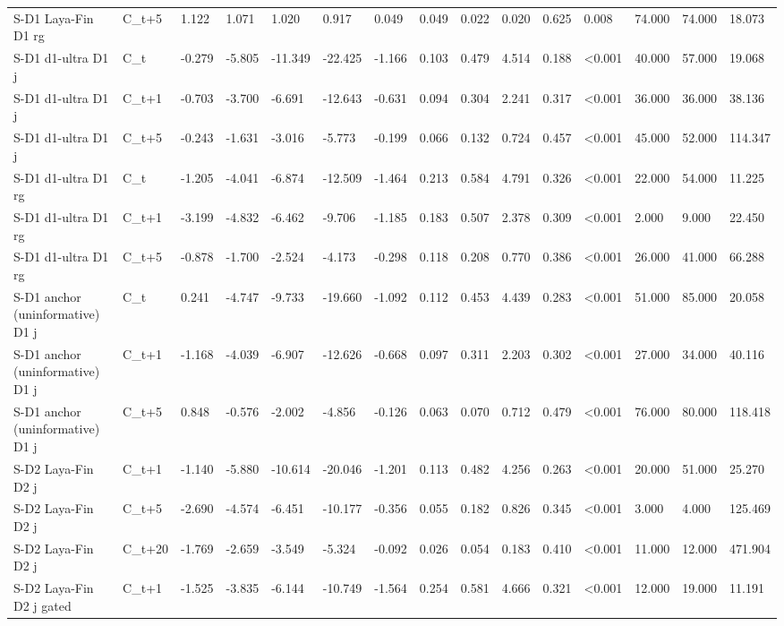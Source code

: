 \begin{tabular}{lllllllllllllll}
S-D1 Laya-Fin D1 rg & C\_t+5 & 1.122 & 1.071 & 1.020 & 0.917 & 0.049 & 0.049 & 0.022 & 0.020 & 0.625 & 0.008 & 74.000 & 74.000 & 18.073 \\
S-D1 d1-ultra D1 j & C\_t & -0.279 & -5.805 & -11.349 & -22.425 & -1.166 & 0.103 & 0.479 & 4.514 & 0.188 & <0.001 & 40.000 & 57.000 & 19.068 \\
S-D1 d1-ultra D1 j & C\_t+1 & -0.703 & -3.700 & -6.691 & -12.643 & -0.631 & 0.094 & 0.304 & 2.241 & 0.317 & <0.001 & 36.000 & 36.000 & 38.136 \\
S-D1 d1-ultra D1 j & C\_t+5 & -0.243 & -1.631 & -3.016 & -5.773 & -0.199 & 0.066 & 0.132 & 0.724 & 0.457 & <0.001 & 45.000 & 52.000 & 114.347 \\
S-D1 d1-ultra D1 rg & C\_t & -1.205 & -4.041 & -6.874 & -12.509 & -1.464 & 0.213 & 0.584 & 4.791 & 0.326 & <0.001 & 22.000 & 54.000 & 11.225 \\
S-D1 d1-ultra D1 rg & C\_t+1 & -3.199 & -4.832 & -6.462 & -9.706 & -1.185 & 0.183 & 0.507 & 2.378 & 0.309 & <0.001 & 2.000 & 9.000 & 22.450 \\
S-D1 d1-ultra D1 rg & C\_t+5 & -0.878 & -1.700 & -2.524 & -4.173 & -0.298 & 0.118 & 0.208 & 0.770 & 0.386 & <0.001 & 26.000 & 41.000 & 66.288 \\
S-D1 anchor (uninformative) D1 j & C\_t & 0.241 & -4.747 & -9.733 & -19.660 & -1.092 & 0.112 & 0.453 & 4.439 & 0.283 & <0.001 & 51.000 & 85.000 & 20.058 \\
S-D1 anchor (uninformative) D1 j & C\_t+1 & -1.168 & -4.039 & -6.907 & -12.626 & -0.668 & 0.097 & 0.311 & 2.203 & 0.302 & <0.001 & 27.000 & 34.000 & 40.116 \\
S-D1 anchor (uninformative) D1 j & C\_t+5 & 0.848 & -0.576 & -2.002 & -4.856 & -0.126 & 0.063 & 0.070 & 0.712 & 0.479 & <0.001 & 76.000 & 80.000 & 118.418 \\
S-D2 Laya-Fin D2 j & C\_t+1 & -1.140 & -5.880 & -10.614 & -20.046 & -1.201 & 0.113 & 0.482 & 4.256 & 0.263 & <0.001 & 20.000 & 51.000 & 25.270 \\
S-D2 Laya-Fin D2 j & C\_t+5 & -2.690 & -4.574 & -6.451 & -10.177 & -0.356 & 0.055 & 0.182 & 0.826 & 0.345 & <0.001 & 3.000 & 4.000 & 125.469 \\
S-D2 Laya-Fin D2 j & C\_t+20 & -1.769 & -2.659 & -3.549 & -5.324 & -0.092 & 0.026 & 0.054 & 0.183 & 0.410 & <0.001 & 11.000 & 12.000 & 471.904 \\
S-D2 Laya-Fin D2 j gated & C\_t+1 & -1.525 & -3.835 & -6.144 & -10.749 & -1.564 & 0.254 & 0.581 & 4.666 & 0.321 & <0.001 & 12.000 & 19.000 & 11.191 \\

\end{tabular}

